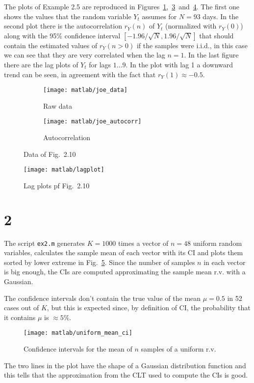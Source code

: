 \documentclass{article}
\newcommand{\inlinecode}[1]{\lstinline[basicstyle=\ttfamily,keywordstyle={}]{#1}}
\begin{document}
The plots of Example 2.5 are reproduced in
Figures~\ref{joe_data},~\ref{joe_autocorr}~and~\ref{joe_lagplot}. The
first one shows the values that the random variable $Y_t$ assumes
for $N = 93$ days. In the second plot there is the autocorrelation
$r_Y(n)$ of $Y_t$ (normalized with $r_Y(0)$) along with the 95\%
confidence interval $[-1.96/\sqrt{N}, 1.96/\sqrt{N}]$ that should
contain the estimated values of $r_Y(n>0)$ if the samples were
i.i.d., in this case we can see that they are very correlated when
the lag $n=1$.  In the last figure there are the lag plots of
$Y_t$ for lags $1\dots9$. In the plot with lag 1 a downward trend
can be seen, in agreement with the fact that $r_Y(1) \approx
-0.5$.
\begin{figure}[htbp]
  \centering
  \begin{subfigure}{.5\textwidth}
    \centering
    \texttt{[image: matlab/joe\_data]}
    \caption{Raw data}
    \label{joe_data}
  \end{subfigure}%
  \begin{subfigure}{.5\textwidth}
    \centering
    \texttt{[image: matlab/joe\_autocorr]}
    \caption{Autocorrelation}
    \label{joe_autocorr}
  \end{subfigure}
  \caption{Data of Fig.~2.10}
\end{figure}
\begin{figure}[htbp]
  \centering
  \texttt{[image: matlab/lagplot]}
  \caption{Lag plots pf Fig.~2.10}
  \label{joe_lagplot}
\end{figure}

\section*{2}
The script \inlinecode{ex2.m} generates $K=1000$ times a vector of
$n=48$ uniform random variables, calculates the sample mean of each
vector with its CI and plots them sorted by lower extreme in
Fig.~\ref{uniform_mean_ci}. Since the number of samples $n$ in each
vector is big enough, the CIs are computed approximating the sample
mean r.v. with a Gaussian.

The confidence intervals don't contain the true value of the mean
$\mu=0.5$ in 52 cases out of $K$, but this is expected since, by
definition of CI, the probability that it contains $\mu$ is $\approx
5\%$.
\begin{figure}[htbp]
  \centering
  \texttt{[image: matlab/uniform\_mean\_ci]}
  \caption{Confidence intervals for the mean of $n$ samples of a uniform r.v.}
  \label{uniform_mean_ci}
\end{figure}
The two lines in the plot have the shape of a Gaussian distribution
function and this tells that the approximation from the CLT used to
compute the CIs is good.
\end{document}
